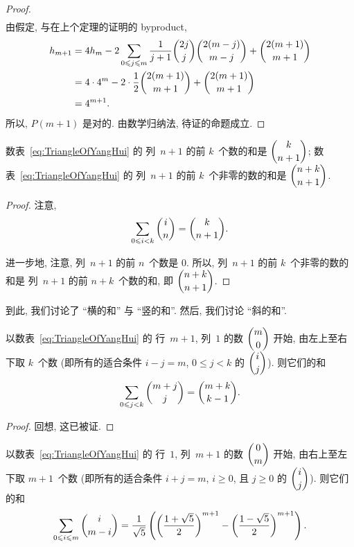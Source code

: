 \documentclass[../libro.tex]{subfiles}
\begin{document}
\begin{proof}
\begin{align*}
    \end{align*}
    由假定, 与在上个定理的证明的 byproduct,
    \begin{align*}
        h_{m+1}
        = {} &
        4 h_m
        - 2 \sum_{0 \leq j \leq m} {\frac{1}{j+1} \dbinom{2j}{j} \dbinom{2(m-j)}{m-j}}
        + \dbinom{2(m+1)}{m+1}
        \\
        = {} &
        4 \cdot 4^m
        - 2 \cdot \frac{1}{2} \dbinom{2(m+1)}{m+1}
        + \dbinom{2(m+1)}{m+1}
        \\
        = {} &
        4^{m+1}.
    \end{align*}
    所以, \(P(m+1)\) 是对的.
    由数学归纳法, 待证的命题成立.
\end{proof}

\begin{theorem}
    数表~\eqref{eq:TriangleOfYangHui} 的%
    列~\(n+1\) 的前 \(k\)~个数的和是
    \(\dbinom{k}{n+1}\);
    数表~\eqref{eq:TriangleOfYangHui} 的%
    列~\(n+1\) 的前 \(k\)~个非零的数的和是
    \(\dbinom{n+k}{n+1}\).
\end{theorem}

\begin{proof}
    注意,
    \begin{align*}
        \sum_{0 \leq i < k} {\dbinom{i}{n}}
        = \dbinom{k}{n+1}.
    \end{align*}

    进一步地, 注意, 列~\(n+1\) 的前 \(n\)~个数是 \(0\).
    所以, 列~\(n+1\) 的前 \(k\)~个非零的数的和是%
    列~\(n+1\) 的前 \(n+k\)~个数的和,
    即 \(\dbinom{n+k}{n+1}\).
\end{proof}

到此, 我们讨论了 ``横的和'' 与 ``竖的和''.
然后, 我们讨论 ``斜的和''.

\begin{theorem}
    以数表~\eqref{eq:TriangleOfYangHui} 的%
    行~\(m+1\), 列~\(1\) 的数 \(\dbinom{m}{0}\) 开始,
    由左上至右下取 \(k\)~个数
    (即所有的适合条件
    \(i - j = m\), \(0 \leq j < k\) 的 \(\dbinom{i}{j}\)).
    则它们的和
    \begin{align*}
        \sum_{0 \leq j < k} {\dbinom{m + j}{j}}
        = \dbinom{m + k}{k - 1}.
    \end{align*}
\end{theorem}

\begin{proof}
    回想, 这已被证.
\end{proof}

\begin{theorem}
    以数表~\eqref{eq:TriangleOfYangHui} 的%
    行~\(1\), 列~\(m+1\) 的数 \(\dbinom{0}{m}\) 开始,
    由右上至左下取 \(m+1\)~个数
    (即所有的适合条件 \(i + j = m\), %
    \(i \geq 0\), 且 \(j \geq 0\) 的
    \(\dbinom{i}{j}\)). %
    则它们的和
    \begin{align*}
        \sum_{0 \leq i \leq m} {\dbinom{i}{m - i}}
        = \frac{1}{\sqrt{5}}
        \left(
            \left(\frac{1 + \sqrt{5}}{2}\right)^{m+1}
            - \left(\frac{1 - \sqrt{5}}{2}\right)^{m+1}
        \right).
    \end{align*}
\end{theorem}
\end{document}
